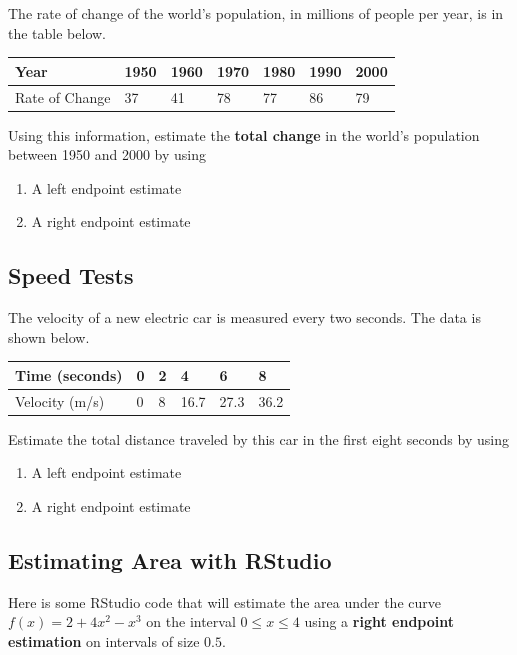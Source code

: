 \documentclass[
]{book}
\providecommand{\tightlist}{%
  \setlength{\itemsep}{0pt}\setlength{\parskip}{0pt}}
\begin{document}
The rate of change of the world's population, in millions of people per year, is in the table below.

\begin{longtable}[]{@{}lllllll@{}}
\toprule
Year & 1950 & 1960 & 1970 & 1980 & 1990 & 2000\tabularnewline
\midrule
\endhead
Rate of Change & 37 & 41 & 78 & 77 & 86 & 79\tabularnewline
\bottomrule
\end{longtable}

Using this information, estimate the \textbf{total change} in the world's population between 1950 and 2000 by using

\begin{enumerate}
\def\labelenumi{\arabic{enumi}.}
\tightlist
\item
  A left endpoint estimate
\item
  A right endpoint estimate
\end{enumerate}

\hypertarget{speed-tests}{%
\subsection{Speed Tests}\label{speed-tests}}

The velocity of a new electric car is measured every two seconds. The data is shown below.

\begin{longtable}[]{@{}llllll@{}}
\toprule
Time (seconds) & 0 & 2 & 4 & 6 & 8\tabularnewline
\midrule
\endhead
Velocity (m/s) & 0 & 8 & 16.7 & 27.3 & 36.2\tabularnewline
\bottomrule
\end{longtable}

Estimate the total distance traveled by this car in the first eight seconds by using

\begin{enumerate}
\def\labelenumi{\arabic{enumi}.}
\tightlist
\item
  A left endpoint estimate
\item
  A right endpoint estimate
\end{enumerate}

\hypertarget{estimating-area-with-rstudio}{%
\subsection{Estimating Area with RStudio}\label{estimating-area-with-rstudio}}

Here is some RStudio code that will estimate the area under the curve \(f(x)=2+4x^2-x^3\) on the interval \(0 \leq x \leq 4\) using a \textbf{right endpoint estimation} on intervals of size \(0.5\).
\end{document}
